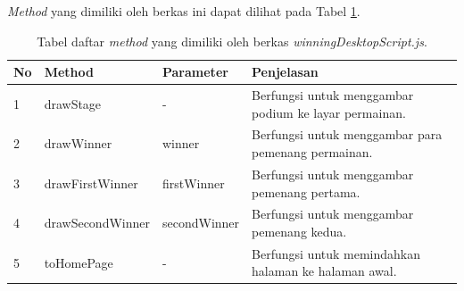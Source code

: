 \begin{enumerate}
\begin{enumerate}
\begin{enumerate}
			\textit{Method} yang dimiliki oleh berkas ini dapat dilihat pada Tabel \ref{table:method_winningDesktopScript}.
			\begin{table}[H]
				\centering
				\caption{Tabel daftar \textit{method} yang dimiliki oleh berkas \textit{winningDesktopScript.js}.}
				\begin{tabular}{|p{0.35cm}|p{3cm}|p{3cm}|p{7cm}|}
					\hline
					No & Method & Parameter & Penjelasan \\ \hline
					1 & drawStage & - & Berfungsi untuk menggambar podium ke layar permainan. \\ \hline
					2 & drawWinner & winner & Berfungsi untuk menggambar para pemenang permainan. \\ \hline
					3 & drawFirstWinner & firstWinner & Berfungsi untuk menggambar pemenang pertama. \\ \hline
					4 & drawSecondWinner & secondWinner & Berfungsi untuk menggambar pemenang kedua. \\ \hline
					5 & toHomePage & - & Berfungsi untuk memindahkan halaman ke halaman awal. \\ \hline
				\end{tabular}
				\label{table:method_winningDesktopScript}
			\end{table}
%				
%				
%				
%				
			

\end{enumerate}
\end{enumerate}
\end{enumerate}
